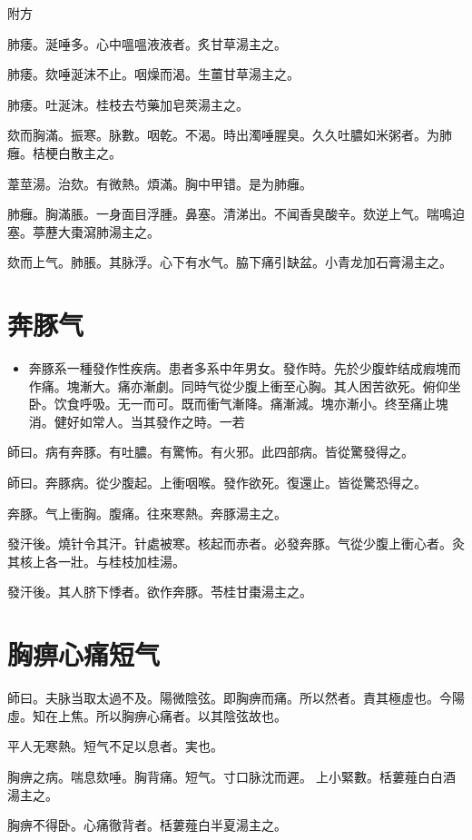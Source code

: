 \documentclass[oneside,b4paper]{ctexbook}
\begin{document}
\begin{flushleft}
附方

肺痿。涎唾多。心中嗢嗢液液者。炙甘草湯主之。

肺痿。欬唾涎沫不止。咽燥而渴。生薑甘草湯主之。

肺痿。吐涎沫。桂枝去芍藥加皂莢湯主之。

欬而胸滿。振寒。脉數。咽乾。不渴。時出濁唾腥臭。久久吐膿如米粥者。为肺癰。桔梗白散主之。

葦莖湯。治欬。有微熱。煩滿。胸中甲错。是为肺癰。

肺癰。胸滿脹。一身面目浮腫。鼻塞。清涕出。不闻香臭酸辛。欬逆上气。喘鳴迫塞。葶藶大棗瀉肺湯主之。

欬而上气。肺脹。其脉浮。心下有水气。脇下痛引缺盆。小青龙加石膏湯主之。

\chapter{奔豚气}

\begin{itemize}
\item 奔豚系一種發作性疾病。患者多系中年男女。發作時。先於少腹蚱结成瘕塊而作痛。塊漸大。痛亦漸劇。同時气從少腹上衝至心胸。其人困苦欲死。俯仰坐卧。饮食呼吸。无一而可。既而衝气漸降。痛漸減。塊亦漸小。终至痛止塊消。健好如常人。当其發作之時。一若
\end{itemize}

師曰。病有奔豚。有吐膿。有驚怖。有火邪。此四部病。皆從驚發得之。

師曰。奔豚病。從少腹起。上衝咽喉。發作欲死。復還止。皆從驚恐得之。

奔豚。气上衝胸。腹痛。往來寒熱。奔豚湯主之。

發汗後。燒针令其汗。针處被寒。核起而赤者。必發奔豚。气從少腹上衝心者。灸其核上各一壯。与桂枝加桂湯。

發汗後。其人脐下悸者。欲作奔豚。苓桂甘棗湯主之。

\chapter{胸痹心痛短气}

師曰。夫脉当取太過不及。陽微陰弦。即胸痹而痛。所以然者。責其極虛也。今陽虛。知在上焦。所以胸痹心痛者。以其陰弦故也。

平人无寒熱。短气不足以息者。実也。

胸痹之病。喘息欬唾。胸背痛。短气。寸口脉沈而遲。{𬮦}上小緊數。栝蔞薤白白酒湯主之。

胸痹不得卧。心痛徹背者。栝蔞薤白半夏湯主之。


\end{flushleft}
\end{document}

